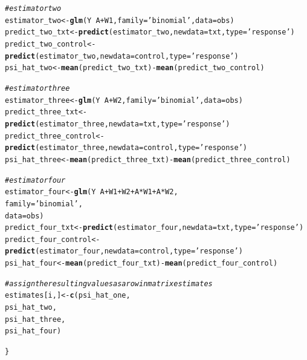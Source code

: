 \documentclass{article}\usepackage[]{graphicx}\usepackage[]{xcolor}
\makeatletter
\newcommand{\hlstr}[1]{\textcolor[rgb]{0.192,0.494,0.8}{#1}}%
\newcommand{\hlcom}[1]{\textcolor[rgb]{0.678,0.584,0.686}{\textit{#1}}}%
\newcommand{\hlopt}[1]{\textcolor[rgb]{0,0,0}{#1}}%
\newcommand{\hlstd}[1]{\textcolor[rgb]{0.345,0.345,0.345}{#1}}%
\newcommand{\hlkwb}[1]{\textcolor[rgb]{0.69,0.353,0.396}{#1}}%
\newcommand{\hlkwc}[1]{\textcolor[rgb]{0.333,0.667,0.333}{#1}}%
\newcommand{\hlkwd}[1]{\textcolor[rgb]{0.737,0.353,0.396}{\textbf{#1}}}%
\newenvironment{kframe}{%
 \def\at@end@of@kframe{}%
 \ifinner\ifhmode%
  \def\at@end@of@kframe{\end{minipage}}%
  \begin{minipage}{\columnwidth}%
 \fi\fi%
 \def\FrameCommand##1{\hskip\@totalleftmargin \hskip-\fboxsep
 \colorbox{shadecolor}{##1}\hskip-\fboxsep
     \hskip-\linewidth \hskip-\@totalleftmargin \hskip\columnwidth}%
 \MakeFramed {\advance\hsize-\width
   \@totalleftmargin\z@ \linewidth\hsize
   \@setminipage}}%
 {\par\unskip\endMakeFramed%
 \at@end@of@kframe}
\newenvironment{knitrout}{}{} %
\makeatother
\begin{document}
\begin{knitrout}
\begin{kframe}
\begin{alltt}
  \hlcom{# estimator two}
  \hlstd{estimator_two} \hlkwb{<-} \hlkwd{glm}\hlstd{(Y} \hlopt{~} \hlstd{A} \hlopt{+} \hlstd{W1,} \hlkwc{family} \hlstd{=} \hlstr{'binomial'}\hlstd{,} \hlkwc{data} \hlstd{= obs)}
  \hlstd{predict_two_txt} \hlkwb{<-} \hlkwd{predict}\hlstd{(estimator_two,} \hlkwc{newdata} \hlstd{= txt,} \hlkwc{type} \hlstd{=} \hlstr{'response'}\hlstd{)}
  \hlstd{predict_two_control} \hlkwb{<-} \hlkwd{predict}\hlstd{(estimator_two,} \hlkwc{newdata} \hlstd{= control,} \hlkwc{type} \hlstd{=} \hlstr{'response'}\hlstd{)}
  \hlstd{psi_hat_two} \hlkwb{<-} \hlkwd{mean}\hlstd{(predict_two_txt)} \hlopt{-} \hlkwd{mean}\hlstd{(predict_two_control)}

  \hlcom{# estimator three}
  \hlstd{estimator_three} \hlkwb{<-} \hlkwd{glm}\hlstd{(Y} \hlopt{~} \hlstd{A} \hlopt{+} \hlstd{W2,} \hlkwc{family} \hlstd{=} \hlstr{'binomial'}\hlstd{,} \hlkwc{data} \hlstd{= obs)}
  \hlstd{predict_three_txt} \hlkwb{<-} \hlkwd{predict}\hlstd{(estimator_three,} \hlkwc{newdata} \hlstd{= txt,} \hlkwc{type} \hlstd{=} \hlstr{'response'}\hlstd{)}
  \hlstd{predict_three_control} \hlkwb{<-} \hlkwd{predict}\hlstd{(estimator_three,} \hlkwc{newdata} \hlstd{= control,} \hlkwc{type} \hlstd{=} \hlstr{'response'}\hlstd{)}
  \hlstd{psi_hat_three} \hlkwb{<-} \hlkwd{mean}\hlstd{(predict_three_txt)} \hlopt{-} \hlkwd{mean}\hlstd{(predict_three_control)}

  \hlcom{# estimator four}
  \hlstd{estimator_four} \hlkwb{<-} \hlkwd{glm}\hlstd{(Y} \hlopt{~} \hlstd{A} \hlopt{+} \hlstd{W1} \hlopt{+} \hlstd{W2} \hlopt{+} \hlstd{A}\hlopt{*}\hlstd{W1} \hlopt{+} \hlstd{A}\hlopt{*}\hlstd{W2,}
                        \hlkwc{family} \hlstd{=} \hlstr{'binomial'}\hlstd{,}
                        \hlkwc{data} \hlstd{= obs)}
  \hlstd{predict_four_txt} \hlkwb{<-} \hlkwd{predict}\hlstd{(estimator_four,} \hlkwc{newdata} \hlstd{= txt,} \hlkwc{type} \hlstd{=} \hlstr{'response'}\hlstd{)}
  \hlstd{predict_four_control} \hlkwb{<-} \hlkwd{predict}\hlstd{(estimator_four,} \hlkwc{newdata} \hlstd{= control,} \hlkwc{type} \hlstd{=} \hlstr{'response'}\hlstd{)}
  \hlstd{psi_hat_four} \hlkwb{<-} \hlkwd{mean}\hlstd{(predict_four_txt)} \hlopt{-} \hlkwd{mean}\hlstd{(predict_four_control)}

  \hlcom{# assign the resulting values as a row in matrix estimates}
  \hlstd{estimates[i,]} \hlkwb{<-} \hlkwd{c}\hlstd{(psi_hat_one,}
                     \hlstd{psi_hat_two,}
                     \hlstd{psi_hat_three,}
                     \hlstd{psi_hat_four)}

\hlstd{\}}
\end{alltt}



\end{kframe}
\end{knitrout}
\end{document}
